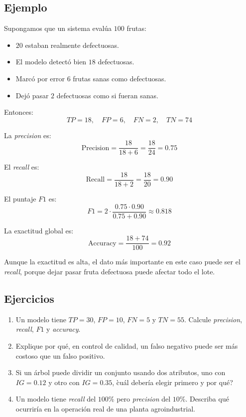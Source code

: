 \documentclass[12pt]{article}
\begin{document}
\subsection{Ejemplo}
Supongamos que un sistema evalúa \(100\) frutas:
\begin{itemize}
    \item \(20\) estaban realmente defectuosas.
    \item El modelo detectó bien \(18\) defectuosas.
    \item Marcó por error \(6\) frutas sanas como defectuosas.
    \item Dejó pasar \(2\) defectuosas como si fueran sanas.
\end{itemize}

Entonces:
\[
TP = 18,\quad FP = 6,\quad FN = 2,\quad TN = 74
\]

La \textit{precision} es:
\[
\text{Precision} = \frac{18}{18+6} = \frac{18}{24} = 0.75
\]

El \textit{recall} es:
\[
\text{Recall} = \frac{18}{18+2} = \frac{18}{20} = 0.90
\]

El puntaje \(F1\) es:
\[
F1 = 2\cdot\frac{0.75\cdot 0.90}{0.75+0.90}
\approx 0.818
\]

La exactitud global es:
\[
\text{Accuracy} = \frac{18+74}{100} = 0.92
\]

Aunque la exactitud es alta, el dato más importante en este caso puede ser el \textit{recall}, porque dejar pasar fruta defectuosa puede afectar todo el lote.

\subsection{Ejercicios}
\begin{enumerate}[label=\arabic*.]
    \item Un modelo tiene \(TP=30\), \(FP=10\), \(FN=5\) y \(TN=55\). Calcule \textit{precision}, \textit{recall}, \(F1\) y \textit{accuracy}.
    \item Explique por qué, en control de calidad, un falso negativo puede ser más costoso que un falso positivo.
    \item Si un árbol puede dividir un conjunto usando dos atributos, uno con \(IG=0.12\) y otro con \(IG=0.35\), \`cuál debería elegir primero y por qué?
    \item Un modelo tiene \textit{recall} del \(100\%\) pero \textit{precision} del \(10\%\). Describa qué ocurriría en la operación real de una planta agroindustrial.
\end{enumerate}
\end{document}
